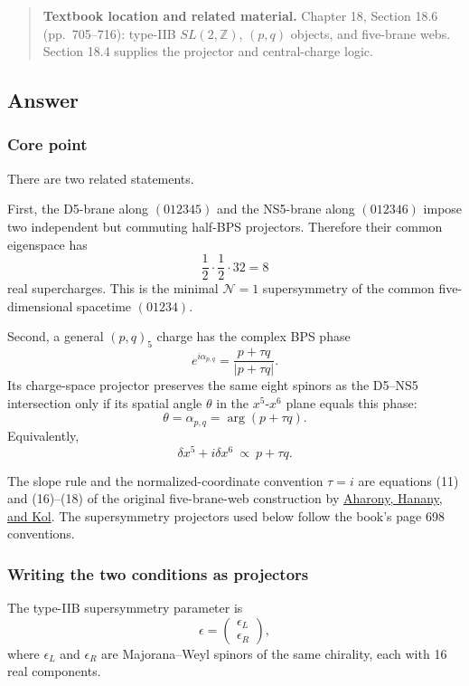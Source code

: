 \documentclass[
  10pt,
  a4paper,
  openany]{book}
\begin{document}
\begin{quote}
\textbf{Textbook location and related material.} Chapter 18, Section
18.6 (pp.~705--716): type-IIB \(SL(2,\mathbb Z)\), \((p,q)\) objects,
and five-brane webs. Section 18.4 supplies the projector and
central-charge logic.
\end{quote}

\subsection{Answer}\label{answer-38}

\subsubsection{Core point}\label{core-point-38}

There are two related statements.

First, the D5-brane along \((012345)\) and the NS5-brane along
\((012346)\) impose two independent but commuting half-BPS projectors.
Therefore their common eigenspace has \[
\frac12\cdot\frac12\cdot32=8
\] real supercharges. This is the minimal \(\mathcal N=1\) supersymmetry
of the common five-dimensional spacetime \((01234)\).

Second, a general \((p,q)_5\) charge has the complex BPS phase \[
e^{i\alpha_{p,q}}
=\frac{p+\tau q}{|p+\tau q|}.
\] Its charge-space projector preserves the same eight spinors as the
D5--NS5 intersection only if its spatial angle \(\theta\) in the
\(x^5\)-\(x^6\) plane equals this phase: \[
\boxed{
\theta=\alpha_{p,q}=\arg(p+\tau q)
}.
\] Equivalently, \[
\boxed{
\delta x^5+i\delta x^6
\ \propto\
p+\tau q
}.
\]

The slope rule and the normalized-coordinate convention \(\tau=i\) are
equations (11) and (16)--(18) of the original five-brane-web
construction by \href{https://arxiv.org/abs/hep-th/9710116}{Aharony,
Hanany, and Kol}. The supersymmetry projectors used below follow the
book's page 698 conventions.

\subsubsection{Writing the two conditions as
projectors}\label{writing-the-two-conditions-as-projectors}

The type-IIB supersymmetry parameter is \[
\epsilon=
\begin{pmatrix}
\epsilon_L\\
\epsilon_R
\end{pmatrix},
\] where \(\epsilon_L\) and \(\epsilon_R\) are Majorana--Weyl spinors of
the same chirality, each with 16 real components.
\end{document}
